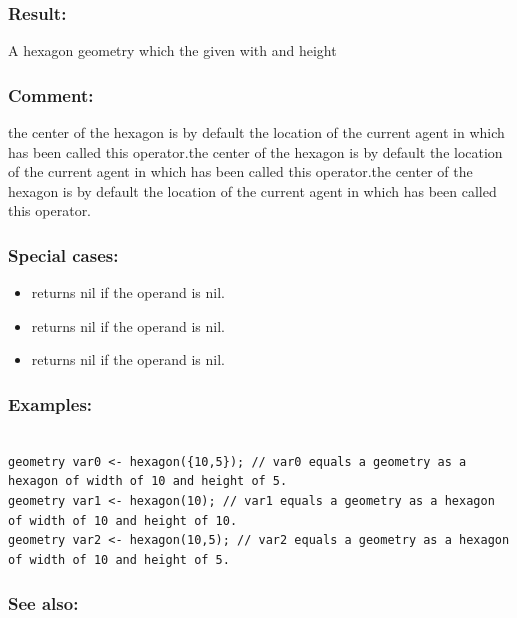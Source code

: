 \documentclass[]{book}
\providecommand{\tightlist}{%
  \setlength{\itemsep}{0pt}\setlength{\parskip}{0pt}}
\theoremstyle{definition}
\theoremstyle{definition}
\theoremstyle{definition}
\theoremstyle{remark}
\begin{document}
\subsubsection{Result:}\label{result-249}

A hexagon geometry which the given with and height

\subsubsection{Comment:}\label{comment-48}

the center of the hexagon is by default the location of the current
agent in which has been called this operator.the center of the hexagon
is by default the location of the current agent in which has been called
this operator.the center of the hexagon is by default the location of
the current agent in which has been called this operator.

\subsubsection{Special cases:}\label{special-cases-75}

\begin{itemize}
\tightlist
\item
  returns nil if the operand is nil.\\
\item
  returns nil if the operand is nil.\\
\item
  returns nil if the operand is nil.
\end{itemize}

\subsubsection{Examples:}\label{examples-198}

\begin{verbatim}
 
geometry var0 <- hexagon({10,5}); // var0 equals a geometry as a hexagon of width of 10 and height of 5. 
geometry var1 <- hexagon(10); // var1 equals a geometry as a hexagon of width of 10 and height of 10. 
geometry var2 <- hexagon(10,5); // var2 equals a geometry as a hexagon of width of 10 and height of 5.
\end{verbatim}

\subsubsection{See also:}\label{see-also-111}
\end{document}

